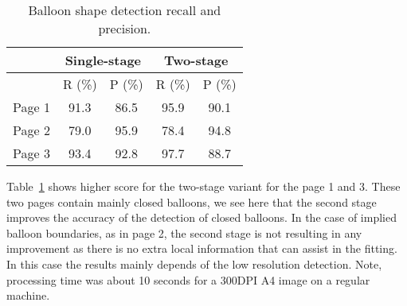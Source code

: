 \documentclass[conference]{IEEEtran}
\begin{document}
	\begin{table}[ht]
		\normalsize
\renewcommand{\arraystretch}{1.2}

		\centering
		\caption{Balloon shape detection recall and precision.}
		\begin{tabular}{|c|c|c|c|c|}
		      \hline
			      & \multicolumn{2}{|c|}{Single-stage} 	& \multicolumn{2}{|c|}{Two-stage}		\\
		      \hline
			      &  R (\%)  & P (\%)  	&  R (\%)  & P (\%) 	\\
		      \hline
		      Page 1 	& 91.3     	& 86.5 		& 95.9     	& 90.1		\\
		      \hline
		      Page 2 	& 79.0     	& 95.9 		& 78.4     	& 94.8		\\
		      \hline
		      Page 3 	& 93.4		& 92.8 		& 97.7		& 88.7     	\\
		      \hline
	      \end{tabular}
		\label{tab:high_res}
	\end{table}%


Table~\ref{tab:high_res} shows higher score for the two-stage variant for the page 1 and 3. These two pages contain mainly closed balloons, we see here that the second stage improves the accuracy of the detection of closed balloons. In the case of implied balloon boundaries, as in page 2, the second stage is not resulting in any improvement as there is no extra local information that can assist in the fitting. In this case the results mainly depends  of the low resolution detection. Note, processing time was about 10 seconds for a 300DPI A4 image on a regular machine.

\end{document}

